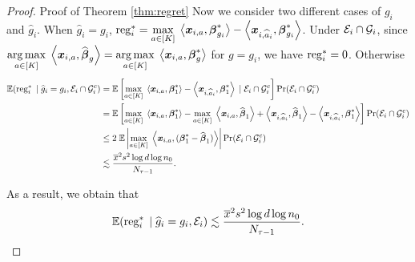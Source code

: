 \begin{proof}{Proof of Theorem \ref{thm:regret}}
Now we consider two different cases of $g_i$ and $\hat g_i$. When $\hat g_i = g_i$, $\reg^{*}_i = \underset{a\in [K]}{\max}\; \angles{\bx_{i,a}, \bbeta_{g_i}^*} - \angles{\bx_{i,\hat a_i}, \bbeta_{g_i}^*}$. Under $\cE_i\cap\cG_i$, since $\underset{a\in [K]}{\arg \max}\; \angles{\bx_{i,a}, \hat\bbeta_{g}}=\underset{a\in [K]}{\arg \max}\; \angles{\bx_{i,a}, \bbeta^*_{g}}$ for $g=g_i$, we have $\reg^{*}_i=0$. Otherwise
\begin{align*} 
	\EE(\reg^{*}_i \cond \hat g_i = g_i, \cE_i \cap \cG_i^c)  &= \EE\brackets{\underset{a\in [K]}{\max}\; \angles{\bx_{i,a}, \bbeta_1^*} - \angles{\bx_{i,\hat a_i}, \bbeta_1^*} \cond \cE_i \cap \cG_i^c}  \Pr( \cE_i \cap \cG_i^c) \\
& = \EE\brackets{ \underset{a\in [K]}{\max}\; \angles{\bx_{i,a}, \bbeta_1^*} - \underset{a\in [K]}{\max}\;  \angles{\bx_{i,a}, \hat \bbeta_1} 
+ \angles{\bx_{i,\hat a_i}, \hat\bbeta_1} - \angles{\bx_{i, \hat a_i}, \bbeta_1^*} }\Pr( \cE_i \cap \cG_i^c)
\\
& \le 2\; \EE\abs{\underset{a\in [K]}{\max}\; \angles{\bx_{i,a}, (\bbeta_1^* - \hat \bbeta_1)}} \Pr( \cE_i \cap \cG_i^c)\\
& \lesssim \frac{\overline{x}^2s^2\log d  \log n_0}{N_{\tau-1}}.
\end{align*}

As a result, we obtain that 
\begin{equation*}
 \EE(\reg^{*}_i \cond \hat g_i =  g_i, \cE_i) \lesssim \frac{\overline{x}^2s^2\log d  \log n_0}{N_{\tau-1}}.
\end{equation*}


\end{proof}
